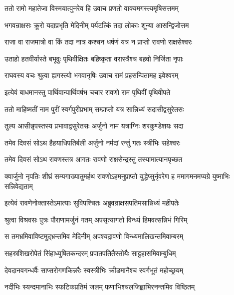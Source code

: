 
\twolineshloka
{ततो रामो महातेजा विस्मयात्पुनरेव हि}
{उवाच प्रणतो वाक्यमगस्त्यमृषिसत्तमम्} %

\twolineshloka
{भगवन्राक्षसः क्रूरो यदाप्रभृति मेदिनीम्}
{पर्यटत्किं तदा लोकाः शून्या आसन्द्विजोत्तम} %

\twolineshloka
{राजा वा राजमात्रो वा किं तदा नात्र कश्चन}
{धर्षणं यत्र न प्राप्तो रावणो राक्षसेश्वरः} %

\twolineshloka
{उताहो हतवीर्यास्ते बभूवुः पृथिवीक्षितः}
{बहिष्कृता वरास्त्रैश्च बहवो निर्जिता नृपाः} %

\twolineshloka
{राघवस्य वचः श्रुत्वा ह्यगस्त्यो भगवानृषिः}
{उवाच रामं प्रहसन्पितामह इवेश्वरम्} %

\twolineshloka
{इत्येवं बाधमानस्तु पार्थिवान्पार्थिवर्षभ}
{चचार रावणो राम पृथिवीं पृथिवीपते} %

\twolineshloka
{ततो माहिष्मतीं नाम पुरीं स्वर्गपुरीप्रभाम्}
{सम्प्राप्तो यत्र सान्निध्यं सदासीद्वसुरेतसः} %

\twolineshloka
{तुल्य आसीन्नृपस्तस्य प्रभावाद्वसुरेतसः}
{अर्जुनो नाम यत्राग्निः शरकुण्डेशयः सदा} %

\twolineshloka
{तमेव दिवसं सोऽथ हैहयाधिपतिर्बली}
{अर्जुनो नर्मदां रन्तुं गतः स्त्रीभिः सहेश्वरः} %

\twolineshloka
{तमेव दिवसं सोऽथ रावणस्तत्र आगतः}
{रावणो राक्षसेन्द्रस्तु तस्यामात्यानपृच्छत} %

\threelineshloka
{क्वार्जुनो नृपतिः शीघ्रं सम्यगाख्यातुमर्हथ}
{रावणोऽहमनुप्राप्तो युद्धेप्सुर्नृवरेण ह}
{ममागमनमप्यग्रे युष्माभिः सन्निवेद्यताम्} %

\twolineshloka
{इत्येवं रावणेनोक्तास्तेऽमात्याः सुविपश्चितः}
{अब्रुवन्राक्षसपतिमसान्निध्यं महीपतेः} %

\twolineshloka
{श्रुत्वा विश्रवसः पुत्रः पौराणामर्जुनं गतम्}
{अपसृत्यागतो विन्ध्यं हिमवत्सन्निभं गिरिम्} %

\twolineshloka
{स तमभ्रमिवाविष्टमुद्भ्रन्तमिव मेदिनीम्}
{अपश्यद्रावणो विन्ध्यमालिखन्तमिवाम्बरम्} %

\twolineshloka
{सहस्रशिखरोपेतं सिंहाध्युषितकन्दरम्}
{प्रपातपतितैस्तोयैः साट्टहासमिवाम्बुधिम्} %

\twolineshloka
{देवदानवगन्धर्वैः साप्सरोगणकिन्नरैः}
{स्वस्त्रीभिः क्रीडमानैश्च स्वर्गभूतं महोच्छ्रयम्} %

\twolineshloka
{नदीभिः स्यन्दमानाभिः स्फटिकप्रतिमं जलम्}
{फणाभिश्चलजिह्वाभिरनन्तमिव विष्ठितम्} %

